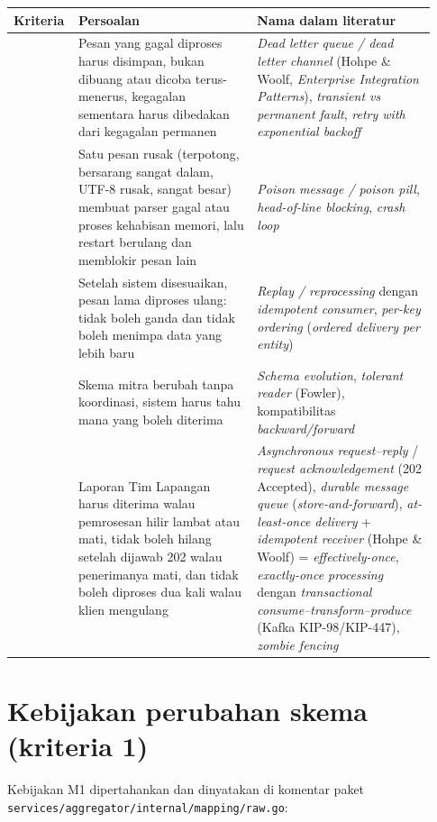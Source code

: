 {\small
\begin{longtable}{@{}>{\raggedright\arraybackslash}p{0.112\linewidth}>{\raggedright\arraybackslash}p{0.411\linewidth}>{\raggedright\arraybackslash}p{0.411\linewidth}@{}}
\toprule
\textbf{Kriteria} & \textbf{Persoalan} & \textbf{Nama dalam literatur} \\
\midrule
\endhead
2 & Pesan yang gagal diproses harus disimpan, bukan dibuang atau dicoba terus-menerus, kegagalan sementara harus dibedakan dari kegagalan permanen & \emph{Dead letter queue / dead letter channel} (Hohpe \& Woolf, \emph{Enterprise Integration Patterns}), \emph{transient vs permanent fault}, \emph{retry with exponential backoff} \\
3 & Satu pesan rusak (terpotong, bersarang sangat dalam, UTF-8 rusak, sangat besar) membuat parser gagal atau proses kehabisan memori, lalu restart berulang dan memblokir pesan lain & \emph{Poison message / poison pill}, \emph{head-of-line blocking}, \emph{crash loop} \\
4 & Setelah sistem disesuaikan, pesan lama diproses ulang: tidak boleh ganda dan tidak boleh menimpa data yang lebih baru & \emph{Replay / reprocessing} dengan \emph{idempotent consumer}, \emph{per-key ordering} (\emph{ordered delivery per entity}) \\
1 & Skema mitra berubah tanpa koordinasi, sistem harus tahu mana yang boleh diterima & \emph{Schema evolution}, \emph{tolerant reader} (Fowler), kompatibilitas \emph{backward/forward} \\
6 & Laporan Tim Lapangan harus diterima walau pemrosesan hilir lambat atau mati, tidak boleh hilang setelah dijawab 202 walau penerimanya mati, dan tidak boleh diproses dua kali walau klien mengulang & \emph{Asynchronous request--reply} / \emph{request acknowledgement} (202 Accepted), \emph{durable message queue} (\emph{store-and-forward}), \emph{at-least-once delivery} + \emph{idempotent receiver} (Hohpe \& Woolf) = \emph{effectively-once}, \emph{exactly-once processing} dengan \emph{transactional consume--transform--produce} (Kafka KIP-98/KIP-447), \emph{zombie fencing} \\
\bottomrule
\end{longtable}
}

\section{Kebijakan perubahan skema (kriteria 1)}

Kebijakan M1 dipertahankan dan dinyatakan di komentar paket \texttt{services/\allowbreak{}aggregator/\allowbreak{}internal/\allowbreak{}mapping/\allowbreak{}raw.\allowbreak{}go}:



